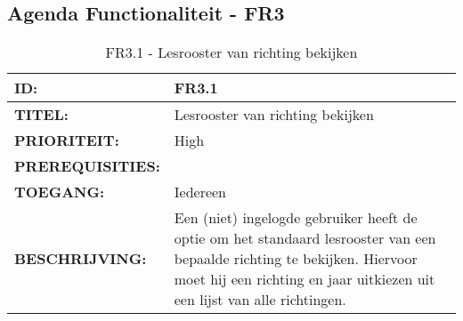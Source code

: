 \subsection{Agenda Functionaliteit - FR3}

\noindent\begin{table}[H]
            \begin{tabular}{l | p{10cm}}
                \textbf{ID:} & FR3.1 \\ \hline
                \textbf{TITEL:} & Lesrooster van richting bekijken \\ \hline
                \textbf{PRIORITEIT:} &  High \\ \hline
                \textbf{PREREQUISITIES:} & \\ \hline
                \textbf{TOEGANG:} &  Iedereen \\ \hline
                \textbf{BESCHRIJVING:} & Een (niet) ingelogde gebruiker heeft de optie om het standaard lesrooster van een bepaalde richting te bekijken. Hiervoor moet hij een richting en jaar uitkiezen uit een lijst van alle richtingen.\\
            \end{tabular}\\
            \caption{FR3.1 - Lesrooster van richting bekijken}
            \label{tab:FR3.1 - Lesrooster van richting bekijken}
        \end{table}

